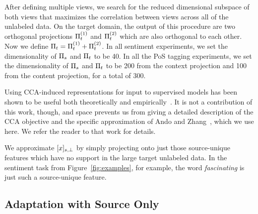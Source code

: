 After defining multiple views, we search for the reduced dimensional
subspace of both views that maximizes the correlation between views
across all of the unlabeled data.  On the target domain, the output of
this procedure are two orthogonal projections $\Pi_t^{(1)}$ and
$\Pi_t^{(2)}$ which are also orthogonal to each other.  Now we define
$\Pi_t = \Pi_t^{(1)} + \Pi_t^{(2)}$.  In all sentiment experiments,
we set the dimensionality of $\Pi_s$ and $\Pi_t$ to be 40.  In all
the PoS tagging experiments, we set the dimensionality of $\Pi_s$ and
$\Pi_t$ to be 200 from the context projection and 100 from the
content projection, for a total of 300.


Using CCA-induced representations for input to supervised models has
been shown to be useful both theoretically and
empirically~\cite{ando07,kakade07}.  It is not a contribution of this
work, though, and space prevents us from giving a detailed description
of the CCA objective and the specific approximation of Ando and
Zhang~\cite{ando07}, which we use here.  We refer the reader to that
work for details.

We approximate ${[x]_{s,\perp}}$ by simply projecting onto just those
source-unique features which have no support in the large target
unlabeled data.  In the sentiment task from Figure~\ref{fig:examples},
for example, the word \emph{fascinating} is just such a source-unique
feature.

\subsection{Adaptation with Source Only}

